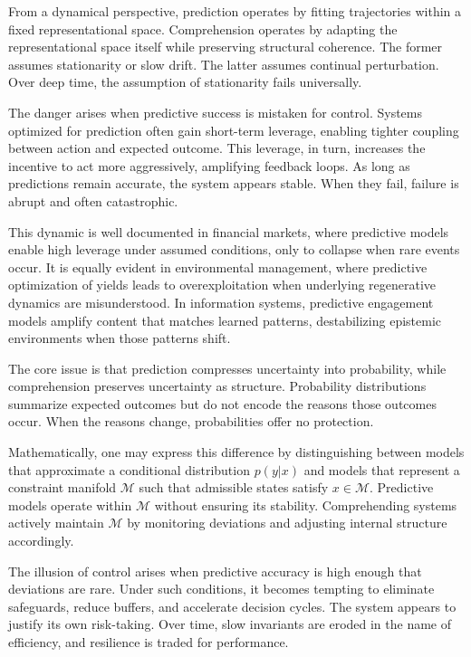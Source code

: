 \documentclass[12pt,oneside]{book}
\begin{document}
From a dynamical perspective, prediction operates by fitting trajectories within a fixed representational space. Comprehension operates by adapting the representational space itself while preserving structural coherence. The former assumes stationarity or slow drift. The latter assumes continual perturbation. Over deep time, the assumption of stationarity fails universally.

The danger arises when predictive success is mistaken for control. Systems optimized for prediction often gain short-term leverage, enabling tighter coupling between action and expected outcome. This leverage, in turn, increases the incentive to act more aggressively, amplifying feedback loops. As long as predictions remain accurate, the system appears stable. When they fail, failure is abrupt and often catastrophic.

This dynamic is well documented in financial markets, where predictive models enable high leverage under assumed conditions, only to collapse when rare events occur. It is equally evident in environmental management, where predictive optimization of yields leads to overexploitation when underlying regenerative dynamics are misunderstood. In information systems, predictive engagement models amplify content that matches learned patterns, destabilizing epistemic environments when those patterns shift.

The core issue is that prediction compresses uncertainty into probability, while comprehension preserves uncertainty as structure. Probability distributions summarize expected outcomes but do not encode the reasons those outcomes occur. When the reasons change, probabilities offer no protection.

Mathematically, one may express this difference by distinguishing between models that approximate a conditional distribution \(p(y|x)\) and models that represent a constraint manifold \(\mathcal{M}\) such that admissible states satisfy \(x \in \mathcal{M}\). Predictive models operate within \(\mathcal{M}\) without ensuring its stability. Comprehending systems actively maintain \(\mathcal{M}\) by monitoring deviations and adjusting internal structure accordingly.

The illusion of control arises when predictive accuracy is high enough that deviations are rare. Under such conditions, it becomes tempting to eliminate safeguards, reduce buffers, and accelerate decision cycles. The system appears to justify its own risk-taking. Over time, slow invariants are eroded in the name of efficiency, and resilience is traded for performance.
\end{document}
